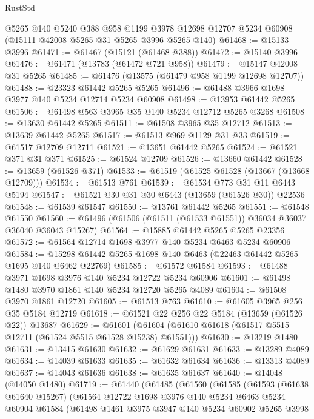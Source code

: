 \begin{lexlean}{RustStd}
\begin{coremodule}
    @5265
    @140
    @5240
    @388
    @958
    @1199
    @3978
    @12698
    @12707
    @5234
    @60908
    (@15111 @42008 @5265 @31 @5265 @3996 @5265 @140)
@61468 := @15133 @3996
@61471 := @61467 (@15121 (@61468 @388))
@61472 := @15140 @3996
@61476 := @61471 (@13783 (@61472 @721 @958))
@61479 := @15147 @42008 @31 @5265
@61485 := @61476 (@13575 (@61479 @958 @1199 @12698 @12707))
@61488 := @23323 @61442 @5265 @5265
@61496 := @61488 @3966 @1698 @3977 @140 @5234 @12714 @5234 @60908
@61498 := @13953 @61442 @5265
@61506 := @61498 @563 @3965 @35 @140 @5234 @12712 @5265 @3268
@61508 := @13630 @61442 @5265
@61511 := @61508 @3965 @35 @12712
@61513 := @13639 @61442 @5265
@61517 := @61513 @969 @1129 @31 @33
@61519 := @61517 @12709 @12711
@61521 := @13651 @61442 @5265
@61524 := @61521 @371 @31 @371
@61525 := @61524 @12709
@61526 := @13660 @61442
@61528 := @13659 (@61526 @371)
@61533 := @61519 (@61525 @61528 (@13667 (@13668 @12709)))
@61534 := @61513 @761
@61539 := @61534 @773 @31 @11 @6443 @5194
@61547 := @61521 @30 @31 @30 @6443 (@13659 (@61526 @30)) @22536
@61548 := @61539 @61547
@61550 := @13761 @61442 @5265
@61551 := @61548 @61550
@61560 := @61496 (@61506 (@61511 (@61533 @61551)) @36034 @36037 @36040 @36043 @15267)
@61564 := @15885 @61442 @5265 @5265 @23356
@61572 := @61564 @12714 @1698 @3977 @140 @5234 @6463 @5234 @60906
@61584 := @15298 @61442 @5265 @1698 @140 @6463 (@22463 @61442 @5265 @1695 @140 @6462 @22769)
@61585 := @61572 @61584
@61593 := @61488 @3971 @1698 @3976 @140 @5234 @12722 @5234 @60906
@61601 := @61498 @1480 @3970 @1861 @140 @5234 @12720 @5265 @4089
@61604 := @61508 @3970 @1861 @12720
@61605 := @61513 @763
@61610 := @61605 @3965 @256 @35 @5184 @12719
@61618 := @61521 @22 @256 @22 @5184 (@13659 (@61526 @22)) @13687
@61629 := @61601 (@61604 (@61610 @61618 (@61517 @5515 @12711 (@61524 @5515 @61528 @15238) @61551)))
@61630 := @13219 @1480
@61631 := @13415 @61630
@61632 := @61629 @61631
@61633 := @13289 @4089
@61634 := @14039 @61633
@61635 := @61632 @61634
@61636 := @13313 @4089
@61637 := @14043 @61636
@61638 := @61635 @61637
@61640 := @14048 (@14050 @1480)
@61719 := @61440
    (@61485
      (@61560
        (@61585
          (@61593
            (@61638 @61640 @15267)
            (@61564
              @12722
              @1698
              @3976
              @140
              @5234
              @6463
              @5234
              @60904
              @61584
              (@61498
                @1461
                @3975
                @3947
                @140
                @5234
                @60902
                @5265
                @3998

\end{coremodule}
\end{lexlean}

